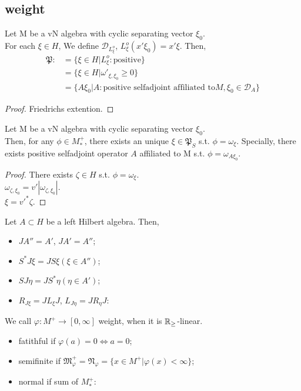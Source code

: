 \subsection{weight}
\begin{proposition}
  Let M be a vN algebra with cyclic separating vector $\xi_0$.\\
  For each $\xi \in H$, We define $\mathcal{D}_{L_\xi^o}$, $L_\xi^o(x'\xi_0) = x'\xi$.
  Then,
  \begin{align*}
    \mathfrak{P} :&= \{ \xi \in H |L_\xi^o : \mbox{positive} \}\\
    &= \{\xi \in H | {\omega'}_{\xi,\xi_0}\geq 0 \}\\
    &= \{A\xi_0 | A:\mbox{positive selfadjoint affiliated to} M, \xi_0 \in \mathcal{D}_A\}
  \end{align*}
\end{proposition}

\begin{proof}
  Friedrichs extention.
\end{proof}

\begin{lemma}
  Let M be a vN algebra with cyclic separating vector $\xi_0$.\\
  Then, for any $\phi \in M_*^+$, there exists an unique $\xi \in \mathfrak{P}_S$ s.t. $\phi = \omega_{\xi}$.
  Specially, there exists positive selfadjoint operator $A$ affiliated to M s.t. $\phi = \omega_{A\xi_0}$.
\end{lemma}

\begin{proof}
  There exists $\zeta \in H$ s.t. $\phi = \omega_\xi$.\\
  $\omega_{\zeta,\xi_0} = v' |\omega_{\zeta,\xi_0}|$.\\
  $\xi = v'^*\zeta$.
\end{proof}

\begin{theorem}
  Let $A \subset H$ be a left Hilbert algebra. Then,
  \begin{itemize}
    \item $JA''=A'$, $JA'=A''$;
    \item $S^*J\xi = JS\xi (\xi \in A'')$;
    \item $SJ\eta = JS^*\eta (\eta \in A')$;
    \item $R_{J\xi} = JL_\xi J$, $L_{J\eta} = JR_\eta J$:
  \end{itemize}
\end{theorem}

\begin{definition}
  We call $\varphi : M^+ \rightarrow [0,\infty]$ weight, when it is $\mathbb{R}_\geq$-linear.
  \begin{itemize}
    \item fatithful if $\varphi(a)=0 \Leftrightarrow a=0$;
    \item semifinite if $\mathfrak{M}_\varphi^+ = \mathfrak{N}_\varphi = \{x \in M^+ | \varphi(x)<\infty\}$;
    \item normal if sum of $M_*^+$:
  \end{itemize}
\end{definition}

